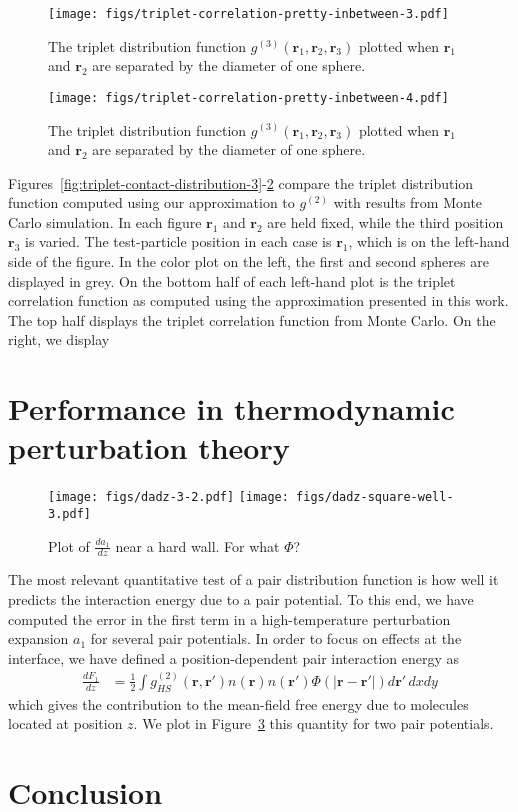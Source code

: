 \documentclass[letterpaper,twocolumn,amsmath,amssymb,pre,aps,10pt]{revtex4-1}
\newcommand{\rr}{\textbf{r}}
\begin{document}
\begin{figure}
  \texttt{[image: figs/triplet-correlation-pretty-inbetween-3.pdf]}
  \caption{The triplet distribution function
    $g^{(3)}(\rr_1,\rr_2,\rr_3)$ plotted when $\rr_1$ and $\rr_2$ are
    separated by the diameter of one sphere.}\label{fig:triplet-inbetween-distribution-3}
\end{figure}
\begin{figure}
  \texttt{[image: figs/triplet-correlation-pretty-inbetween-4.pdf]}
  \caption{The triplet distribution function
    $g^{(3)}(\rr_1,\rr_2,\rr_3)$ plotted when $\rr_1$ and $\rr_2$ are
    separated by the diameter of one sphere.}\label{fig:triplet-inbetween-distribution-4}
\end{figure}

Figures~\ref{fig:triplet-contact-distribution-3}-\ref{fig:triplet-inbetween-distribution-4}
compare the triplet distribution function computed using our
approximation to $g^{(2)}$ with results from Monte Carlo simulation.
In each figure $\rr_1$ and $\rr_2$ are held fixed, while the third
position $\rr_3$ is varied.  The test-particle position in each case
is $\rr_1$, which is on the left-hand side of the figure.  In the
color plot on the left, the first and second spheres are displayed in
grey.  On the bottom half of each left-hand plot is the triplet
correlation function as computed using the approximation presented in
this work.  The top half displays the triplet correlation function
from Monte Carlo.  On the right, we display 


\section{Performance in thermodynamic perturbation theory}

\begin{figure}
  \texttt{[image: figs/dadz-3-2.pdf]}
  \texttt{[image: figs/dadz-square-well-3.pdf]}
  \caption{Plot of $\frac{da_1}{dz}$ near a hard
    wall. For what $\Phi$?}\label{fig:dadz}
\end{figure}

The most relevant quantitative test of a pair distribution function is
how well it predicts the interaction energy due to a pair potential.
To this end, we have computed the error in the first term in a
high-temperature perturbation expansion $a_1$ for several pair
potentials.  In order to focus on effects at the interface, we have
defined a position-dependent pair interaction energy as
\begin{align}
  \frac{dF_1}{dz} &=
  \tfrac12 \int g^{(2)}_{HS}(\rr,\rr')n(\rr)n(\rr')\Phi(|\rr-\rr'|)
  d\rr'\, dxdy
\end{align}
which gives the contribution to the mean-field free energy due to
molecules located at position $z$.  We plot in Figure~\ref{fig:dadz}
this quantity for two pair potentials.

\section{Conclusion}

\end{document}

